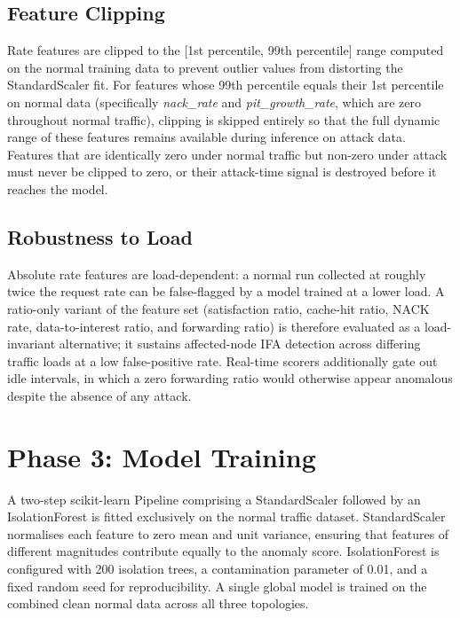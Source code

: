 \documentclass[12pt]{report}
\begin{document}
\subsection{Feature Clipping}

Rate features are clipped to the [1st percentile, 99th percentile] range computed on the normal training data to prevent outlier values from distorting the StandardScaler fit. For features whose 99th percentile equals their 1st percentile on normal data (specifically \textit{nack\_rate} and \textit{pit\_growth\_rate}, which are zero throughout normal traffic), clipping is skipped entirely so that the full dynamic range of these features remains available during inference on attack data. Features that are identically zero under normal traffic but non-zero under attack must never be clipped to zero, or their attack-time signal is destroyed before it reaches the model.

\subsection{Robustness to Load}

Absolute rate features are load-dependent: a normal run collected at roughly twice the request rate can be false-flagged by a model trained at a lower load. A ratio-only variant of the feature set (satisfaction ratio, cache-hit ratio, NACK rate, data-to-interest ratio, and forwarding ratio) is therefore evaluated as a load-invariant alternative; it sustains affected-node IFA detection across differing traffic loads at a low false-positive rate. Real-time scorers additionally gate out idle intervals, in which a zero forwarding ratio would otherwise appear anomalous despite the absence of any attack.

\section{Phase 3: Model Training}

A two-step scikit-learn Pipeline comprising a StandardScaler followed by an IsolationForest is fitted exclusively on the normal traffic dataset. StandardScaler normalises each feature to zero mean and unit variance, ensuring that features of different magnitudes contribute equally to the anomaly score. IsolationForest is configured with 200 isolation trees, a contamination parameter of 0.01, and a fixed random seed for reproducibility. A single global model is trained on the combined clean normal data across all three topologies.
\end{document}

